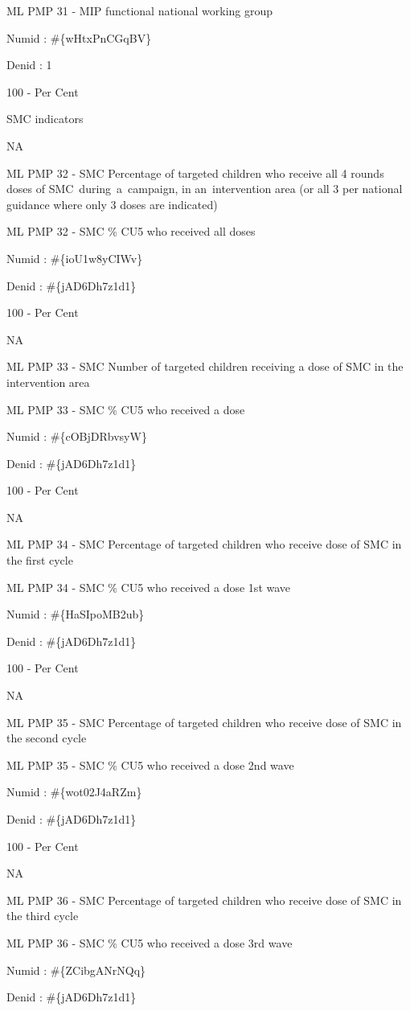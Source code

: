 \documentclass[]{book}
\begin{document}
ML PMP 31 - MIP functional national working group

Numid : \#\{wHtxPnCGqBV\}

Denid : 1

100 - Per Cent

SMC indicators

NA

ML PMP 32 - SMC Percentage of targeted children who receive all 4 rounds doses of SMC~during~a~campaign, in an~intervention area (or all 3 per national guidance where only 3 doses are indicated)

ML PMP 32 - SMC \% CU5 who received all doses

Numid : \#\{ioU1w8yCIWv\}

Denid : \#\{jAD6Dh7z1d1\}

100 - Per Cent

NA

ML PMP 33 - SMC Number of targeted children receiving a dose of SMC in the intervention area

ML PMP 33 - SMC \% CU5 who received a dose

Numid : \#\{cOBjDRbvsyW\}

Denid : \#\{jAD6Dh7z1d1\}

100 - Per Cent

NA

ML PMP 34 - SMC Percentage of targeted children who receive dose of SMC in the first cycle

ML PMP 34 - SMC \% CU5 who received a dose 1st wave

Numid : \#\{HaSIpoMB2ub\}

Denid : \#\{jAD6Dh7z1d1\}

100 - Per Cent

NA

ML PMP 35 - SMC Percentage of targeted children who receive dose of SMC in the second cycle

ML PMP 35 - SMC \% CU5 who received a dose 2nd wave

Numid : \#\{wot02J4aRZm\}

Denid : \#\{jAD6Dh7z1d1\}

100 - Per Cent

NA

ML PMP 36 - SMC Percentage of targeted children who receive dose of SMC in the third cycle

ML PMP 36 - SMC \% CU5 who received a dose 3rd wave

Numid : \#\{ZCibgANrNQq\}

Denid : \#\{jAD6Dh7z1d1\}
\end{document}
